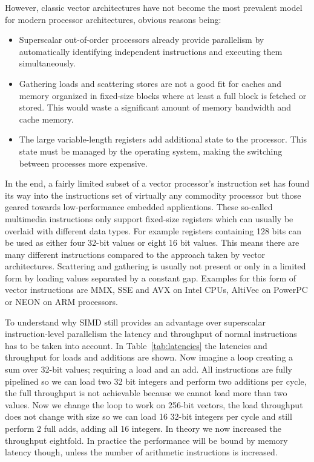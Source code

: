 However, classic vector architectures have not become the most prevalent model
for modern processor architectures, obvious reasons being:
\begin{itemize}
\item Superscalar out-of-order processors already provide parallelism by
automatically identifying independent instructions and executing them
simultaneously.
\item Gathering loads and scattering stores are not a good fit for caches and
memory organized in fixed-size blocks where at least a full block is fetched or
stored. This would waste a significant amount of memory bandwidth and cache
memory.
\item The large variable-length registers add additional state to the processor.
This state must be managed by the operating system, making the switching between
processes more expensive.
\end{itemize}

In the end, a fairly limited subset of a vector processor's instruction set has
found its way into the instructions set of virtually any commodity processor but
those geared towards low-performance embedded applications. These so-called
multimedia instructions only support fixed-size registers which can usually be
overlaid with different data types. For example registers containing 128 bits
can be used as either four 32-bit values or eight 16 bit values. This means
there are many different instructions compared to the approach taken by vector
architectures.  Scattering and gathering is usually not present or only in a
limited form by loading values separated by a constant gap.  Examples for this
form of vector instructions are MMX, SSE and AVX on Intel CPUs, AltiVec on
PowerPC or NEON on ARM processors.

To understand why SIMD still provides an advantage over superscalar
instruction-level parallelism the latency and throughput of normal instructions
has to be taken into account. In Table~\ref{tab:latencies} the latencies and
throughput for loads and additions are shown. Now imagine a loop creating a sum
over 32-bit values; requiring a load and an add. All instructions are fully
pipelined so we can load two 32 bit integers and perform two additions per
cycle, the full throughput is not achievable because we cannot load more than
two values. Now we change the loop to work on 256-bit vectors, the load
throughput does not change with size so we can load 16 32-bit integers per cycle
and still perform 2 full adds, adding all 16 integers. In theory we now
increased the throughput eightfold. In practice the performance will be bound by
memory latency though, unless the number of arithmetic instructions is
increased.

